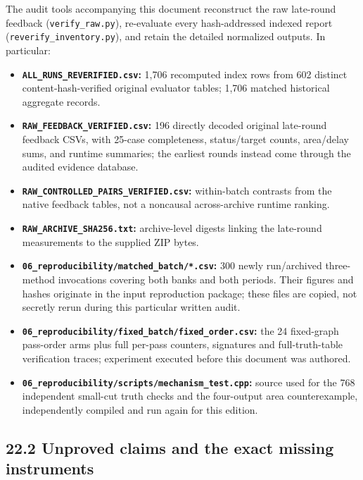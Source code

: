\documentclass[a4paper,10pt]{article}
\providecommand{\tightlist}{\setlength{\itemsep}{0pt}\setlength{\parskip}{0pt}}
\theoremstyle{definition}
\theoremstyle{remark}
\begin{document}
The audit tools accompanying this document reconstruct the raw late-round feedback (\texttt{verify\_raw.py}), re-evaluate every hash-addressed indexed report (\texttt{reverify\_inventory.py}), and retain the detailed normalized outputs. In particular:

\begin{itemize}
\tightlist
\item
  \textbf{\texttt{ALL\_RUNS\_REVERIFIED.csv}:} 1,706 recomputed index rows from 602 distinct content-hash-verified original evaluator tables; 1,706 matched historical aggregate records.
\item
  \textbf{\texttt{RAW\_FEEDBACK\_VERIFIED.csv}:} 196 directly decoded original late-round feedback CSVs, with 25-case completeness, status/target counts, area/delay sums, and runtime summaries; the earliest rounds instead come through the audited evidence database.
\item
  \textbf{\texttt{RAW\_CONTROLLED\_PAIRS\_VERIFIED.csv}:} within-batch contrasts from the native feedback tables, not a noncausal across-archive runtime ranking.
\item
  \textbf{\texttt{RAW\_ARCHIVE\_SHA256.txt}:} archive-level digests linking the late-round measurements to the supplied ZIP bytes.
\item
  \textbf{\texttt{06\_reproducibility/matched\_batch/*.csv}:} 300 newly run/archived three-method invocations covering both banks and both periods. Their figures and hashes originate in the input reproduction package; these files are copied, not secretly rerun during this particular written audit.
\item
  \textbf{\texttt{06\_reproducibility/fixed\_batch/fixed\_order.csv}:} the 24 fixed-graph pass-order arms plus full per-pass counters, signatures and full-truth-table verification traces; experiment executed before this document was authored.
\item
  \textbf{\texttt{06\_reproducibility/scripts/mechanism\_test.cpp}:} source used for the 768 independent small-cut truth checks and the four-output area counterexample, independently compiled and run again for this edition.
\end{itemize}

\subsection{22.2 Unproved claims and the exact missing instruments}\label{unproved-claims-and-the-exact-missing-instruments}
\end{document}

